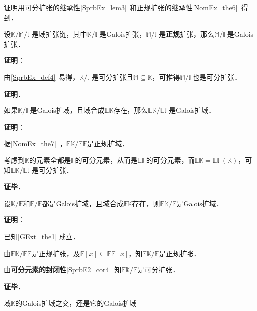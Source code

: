 证明用可分扩张的继承性\autoref{SprbEx_lem3}~和正规扩张的继承性\autoref{NomEx_the6}~得到．

\begin{theorem}{}\label{GExt_the5}
设$\mathbb{K}/\mathbb{M}/\mathbb{F}$是域扩张链，其中$\mathbb{K}/\mathbb{F}$是Galois扩张，$\mathbb{M}/\mathbb{F}$是\textbf{正规}扩张，那么$\mathbb{M}/\mathbb{F}$是Galois扩张．
\end{theorem}

\textbf{证明}：

由\autoref{SprbEx_def4}~易得，$\mathbb{K}/\mathbb{F}$是可分扩张且$\mathbb{M}\subseteq\mathbb{K}$，可推得$\mathbb{M}/\mathbb{F}$也是可分扩张．

\textbf{证明}．

\begin{theorem}{}\label{GExt_the1}
如果$\mathbb{K}/\mathbb{F}$是Galois扩域，且域合成$\mathbb{EK}$存在，那么$\mathbb{EK}/\mathbb{EF}$是Galois扩域．
\end{theorem}

\textbf{证明}：

据\autoref{NomEx_the7}~，$\mathbb{EK}/\mathbb{EF}$是正规扩域．

考虑到$\mathbb{K}$的元素全都是$\mathbb{F}$的可分元素，从而是$\mathbb{EF}$的可分元素，而$\mathbb{EK}=\mathbb{EF}(\mathbb{K})$，可知$\mathbb{EK}/\mathbb{EF}$是可分扩张．

\textbf{证毕}．



\begin{theorem}{}
设$\mathbb{K}/\mathbb{F}$和$\mathbb{E}/\mathbb{F}$都是Galois扩域，且域合成$\mathbb{EK}$存在，则$\mathbb{EK}/\mathbb{F}$是Galois扩域．
\end{theorem}

\textbf{证明}：

已知\autoref{GExt_the1} 成立．

由$\mathbb{EK}/\mathbb{EF}$是正规扩张，及$\mathbb{F}[x]\subseteq\mathbb{EF}[x]$，知$\mathbb{EK}/\mathbb{F}$是正规扩张．

由\textbf{可分元素的封闭性}\autoref{SprbE2_cor4}~知$\mathbb{EK}/\mathbb{F}$是可分扩张．

\textbf{证毕}．




\begin{theorem}{}
域$\mathbb{K}$的Galois扩域之交，还是它的Galois扩域
\end{theorem}

